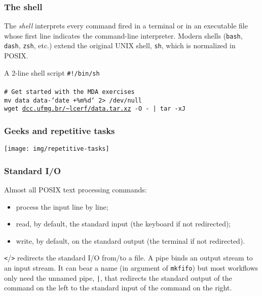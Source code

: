 \documentclass{beamer}
\begin{document}
\begin{frame}
  \frametitle{The shell}
  The \emph{shell} interprets every command fired in a terminal or in
  an executable file whose first line indicates the command-line
  interpreter. Modern shells (\texttt{bash}, \texttt{dash},
  \texttt{zsh}, etc.) extend the original UNIX shell, \texttt{sh},
  which is normalized in POSIX.

  \vfill

  \begin{exampleblock}{A 2-line shell script}
    \texttt{\#!/bin/sh}\\
    ~\\
    \texttt{\# Get started with the MDA exercises}\\
    \texttt{mv data data-`date +\%m\%d` 2> /dev/null}\\
    \texttt{wget \url{dcc.ufmg.br/~lcerf/data.tar.xz} -O - | tar -xJ}
  \end{exampleblock}
\end{frame}

\begin{frame}
  \frametitle{Geeks and repetitive tasks}
  \texttt{[image: img/repetitive-tasks]}
\end{frame}

\begin{frame}
  \frametitle{Standard I/O}
  Almost all POSIX text processing commands:
  \begin{itemize}
  \item process the input line by line;
  \item read, by default, the standard input (the keyboard if not
    redirected);
  \item write, by default, on the standard output (the terminal if not
    redirected).
  \end{itemize}

  \vfill
  \pause

  \texttt{<}/\texttt{>} redirects the standard I/O from/to a file. A
  pipe binds an output stream to an input stream. It can bear a name
  (in argument of \texttt{mkfifo}) but most workflows only need the
  unnamed pipe, \texttt{|}, that redirects the standard output of the
  command on the left to the standard input of the command on the
  right.
\end{frame}
\end{document}

